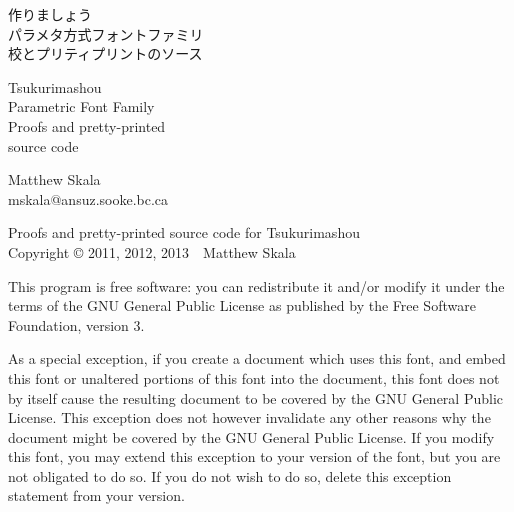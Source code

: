 
\makeatletter{}\makeatother



\pagestyle{plain}\thispagestyle{empty}


\kaku
\begin{center}\LARGE

\vspace*{\fill}

{\Huge 作りましょう~\TsukurimashouVWide}\\
{\huge パラメタ方式フォントファミリ\\
校とプリティプリントのソース}

\vspace*{0.75in}

{\Huge Tsukurimashou~\TsukurimashouVersion}\\
{\huge Parametric Font Family\\
Proofs and pretty-printed\\source code}

\vspace*{1.5in}

Matthew Skala\\
mskala@ansuz.sooke.bc.ca\\
\TsukurimashouRDWide\qquad\TsukurimashouReleaseDate

\vspace*{\fill}

\end{center}
\clearpage


\vspace*{\fill}

Proofs and pretty-printed source code for Tsukurimashou\\
Copyright © 2011, 2012, 2013~~Matthew Skala

This program is free software: you can redistribute it and/or modify
it under the terms of the GNU General Public License as published by
the Free Software Foundation, version 3.

As a special exception, if you create a document which uses this font, and
embed this font or unaltered portions of this font into the document, this
font does not by itself cause the resulting document to be covered by the
GNU General Public License. This exception does not however invalidate any
other reasons why the document might be covered by the GNU General Public
License. If you modify this font, you may extend this exception to your
version of the font, but you are not obligated to do so. If you do not
wish to do so, delete this exception statement from your version.

